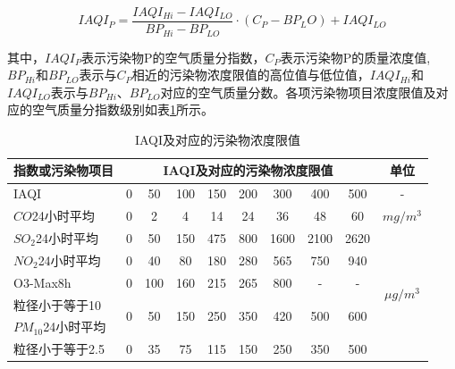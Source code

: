 \documentclass[a4paper,10pt]{my_paper}
\numberwithin{equation}{section}
\begin{document}
\begin{equation}
    IAQI_P = \frac{IAQI_{Hi}-IAQI_{LO}}{BP_{Hi}-BP_{LO}}\cdot(C_P-BP_LO)+IAQI_{LO}
\end{equation}

其中，${IAQI_P}$表示污染物P的空气质量分指数，${C_P}$表示污染物P的质量浓度值,${BP_{Hi}}$和${BP_{LO}}$表示与${C_P}$相近的污染物浓度限值的高位值与低位值，${IAQI_{Hi}}$和${IAQI_{LO}}$表示与${BP_{Hi}}$、${BP_{LO}}$对应的空气质量分数。各项污染物项目浓度限值及对应的空气质量分指数级别如表\ref{tab1}所示。

\begin{table}[htbp]
    \centering
    \caption{IAQI及对应的污染物浓度限值}\label{tab1}%
    \begin{threeparttable}
      \begin{tabular}{p{9em}ccccccccc}
      \toprule
      指数或污染物项目 & \multicolumn{8}{p{32.44em}}{IAQI及对应的污染物浓度限值}                & \multicolumn{1}{p{4.055em}}{单位} \\
      \midrule
      IAQI  & 0     & 50    & 100   & 150   & 200   & 300   & 400   & 500   & \multicolumn{1}{p{4.055em}}{-} \\
      ${CO}$24小时平均 & 0     & 2     & 4     & 14    & 24    & 36    & 48    & 60    & \multicolumn{1}{p{4.055em}}{${mg/m^3}$} \\
      ${SO_2}$24小时平均 & 0     & 50    & 150   & 475   & 800   & 1600  & 2100  & 2620  & \multicolumn{1}{c}{\multirow{7}[1]{*}{${\mu g/m^3}$}} \\
      ${NO_2}$24小时平均 & 0     & 40    & 80    & 180   & 280   & 565   & 750   & 940   &  \\
      O3-Max8h & 0     & 100   & 160   & 215   & 265   & 800   & \multicolumn{1}{p{4.055em}}{-} & \multicolumn{1}{p{4.055em}}{-} &  \\
      粒径小于等于10 & \multirow{2}[0]{*}{0} & \multirow{2}[0]{*}{50} & \multirow{2}[0]{*}{150} & \multirow{2}[0]{*}{250} & \multirow{2}[0]{*}{350} & \multirow{2}[0]{*}{420} & \multirow{2}[0]{*}{500} & \multirow{2}[0]{*}{600} &  \\
      ${PM_10}$24小时平均 &       &       &       &       &       &       &       &       &  \\
      粒径小于等于2.5 & \multirow{2}[1]{*}{0} & \multirow{2}[1]{*}{35} & \multirow{2}[1]{*}{75} & \multirow{2}[1]{*}{115} & \multirow{2}[1]{*}{150} & \multirow{2}[1]{*}{250} & \multirow{2}[1]{*}{350} & \multirow{2}[1]{*}{500} &  \\

\end{tabular}
\end{threeparttable}
\end{table}
\end{document}
